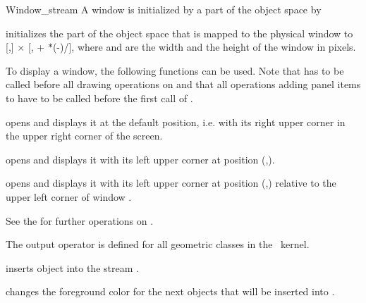 \begin{ccClass} {Window_stream}
\ccOperations
A window is initialized by a part of the object space by

{initializes the  part of the object space that is mapped to the physical
window to [,] $\times$ 
[, + $*$(-)/],
where  and  are the width and the height of the window in pixels.}

To display a window, the following functions can be used. Note that  
has to be called before all drawing operations on  and that all operations adding 
panel items to  have to be called before the first call of .

{opens  and displays it at the default position, i.e. 
with its right upper corner in the upper right corner of the screen.}

{opens  and displays it with its left upper corner at position
(,).}

{opens  and displays it with its left upper corner at position 
(,) relative to the upper left corner of  window .}

See the 
\cite{mnsu-lum} for further operations on .

\def\ccTagRmEigenClassName{\ccFalse}


The output operator is defined for all geometric classes in the \cgal\ kernel.

       {inserts object  into the stream \ccVar.}

       {changes the foreground color for the next objects that
        will be inserted into \ccVar.}


\end{ccClass}
